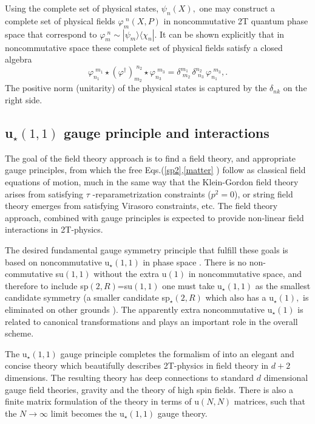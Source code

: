 \documentclass[a4paper,12pt]{article}
\begin{document}
Using the complete set of physical states, $\psi _{n}\left(
X\right) ,$ one may construct a complete set of physical fields
$\varphi _{m}^{\,\,n}\left( X,P\right) $ in noncommutative 2T
quantum phase space that correspond to $ \varphi _{m}^{\,\,n}\sim
|\psi _{m}\rangle \langle \chi _{n}|$. It can be shown explicitly
that in noncommutative space these complete set of physical fields
satisfy a closed algebra \cite{NCSp}
\begin{equation}
\varphi _{n_{1}}^{\,\,m_{1}}\star \left( \varphi ^{\dagger }\right)
_{m_{2}}^{\,\,n_{2}}\star \varphi _{n_{3}}^{\,\,m_{3}}=\delta
_{\,\,m_{2}}^{m_{1}}\,\delta _{\,\,n_{3}}^{n_{2}}\,\varphi
_{n_{1}}^{\,\,m_{3}},.
\end{equation}
The positive norm (unitarity) of the physical states is captured
by the $ \delta _{nk}$ on the right side.

\subsection{u$_{\star }\left( 1,1\right) $ gauge principle and interactions}

The goal of the field theory approach is to find a field theory,
and appropriate gauge principles, from which the free
Eqs.(\ref{sp2},\ref{matter} ) follow as classical field equations
of motion, much in the same way that
the Klein-Gordon field theory arises from satisfying $\tau $%
-reparametrization constraints ($p^{2}=0$), or string field theory emerges
from satisfying Virasoro constraints, etc. The field theory approach,
combined with gauge principles is expected to provide non-linear field
interactions in 2T-physics.

The desired fundamental gauge symmetry principle that fulfill these goals is
based on noncommutative u$_{\star }\left( 1,1\right) $ in phase space \cite
{NCu11}. There is no non-commutative su$\left( 1,1\right) $ without the
extra u$\left( 1\right) $ in noncommutative space, and therefore to include
sp$\left( 2,R\right) $=su$\left( 1,1\right) $ one must take u$_{\star
}\left( 1,1\right) $ as the smallest candidate symmetry (a smaller candidate
sp$_{\star }\left( 2,R\right) $ \cite{ncOn} which also has a u$_{\star
}\left( 1\right) ,$ is eliminated on other grounds \cite{NCu11}). The
apparently extra noncommutative u$_{\star }\left( 1\right) $ is related to
canonical transformations and plays an important role in the overall scheme.

The u$_{\star }\left( 1,1\right) $ gauge principle completes the formalism
of \cite{NCSp} into an elegant and concise theory which beautifully
describes 2T-physics in field theory in $d+2$ dimensions. The resulting
theory has deep connections to standard $d$ dimensional gauge field
theories, gravity and the theory of high spin fields. There is also a finite
matrix formulation of the theory in terms of u$\left( N,N\right) $ matrices,
such that the $N\rightarrow \infty $ limit becomes the u$_{\star }\left(
1,1\right) $ gauge theory.
\end{document}
